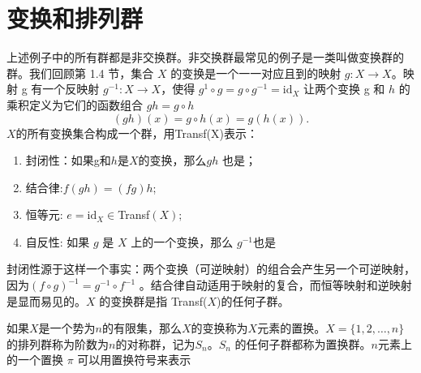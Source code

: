\section{变换和排列群}
上述例子中的所有群都是非交换群。非交换群最常见的例子是一类叫做变换群的群。我们回顾第 1.4 节，集合 $X$ 的变换是一个一一对应且到的映射 $g:X\to X$。映射 g 有一个反映射 $g^{-1}:X\to X$，使得 $g^{1}\circ g=g\circ g^{-1}=\mathrm{id}_X$ 让两个变换 g 和 $h$ 的乘积定义为它们的函数组合 $gh=g\circ h$
$$
(gh)(x)=g\circ h(x)=g(h(x)).
$$
$X$的所有变换集合构成一个群，用Transf(X)表示：
\begin{enumerate}
 \item[] 封闭性：如果g和$h$是$X$的变换，那么$gh$ 也是；
 \item[] 结合律{:}\:$f(gh)=(fg)h${;}
 \item[] 恒等元{: }$e= \mathrm{id}_X\in $Transf$( X) ; $
 \item[] 自反性: 如果 $g$ 是 $X$ 上的一个变换，那么 $g^{-1} $也是
\end{enumerate}
封闭性源于这样一个事实：两个变换（可逆映射）的组合会产生另一个可逆映射，因为$(f\circ g)^{-1}=g^{-1}\circ f^{-1}$ 。结合律自动适用于映射的复合，而恒等映射和逆映射是显而易见的。$X$ 的变换群是指 Transf($X$)的任何子群。

如果$X$是一个势为$n$的有限集，那么$X$的变换称为$X$元素的置换。$X=\{1,2,\dots,n\}$的排列群称为阶数为$n$的对称群，记为$S_n$。$S_n$ 的任何子群都称为置换群。$n$元素上的一个置换 $\pi$ 可以用置换符号来表示

